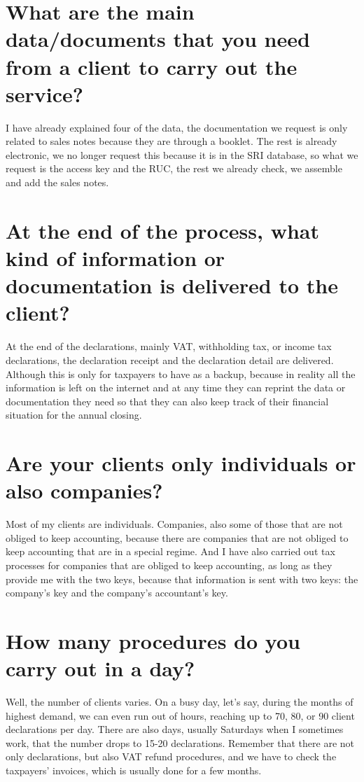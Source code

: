 \documentclass[a4paper]{article}
\begin{document}
\section{What are the main data/documents that you need from a client to carry out the service?}

I have already explained four of the data, the documentation we request is only related to sales notes because they are through a booklet. The rest is already electronic, we no longer request this because it is in the SRI database, so what we request is the access key and the RUC, the rest we already check, we assemble and add the sales notes.

\section{At the end of the process, what kind of information or documentation is delivered to the client?}

At the end of the declarations, mainly VAT, withholding tax, or income tax declarations, the declaration receipt and the declaration detail are delivered. Although this is only for taxpayers to have as a backup, because in reality all the information is left on the internet and at any time they can reprint the data or documentation they need so that they can also keep track of their financial situation for the annual closing.

\section{Are your clients only individuals or also companies?}

Most of my clients are individuals. Companies, also some of those that are not obliged to keep accounting, because there are companies that are not obliged to keep accounting that are in a special regime. And I have also carried out tax processes for companies that are obliged to keep accounting, as long as they provide me with the two keys, because that information is sent with two keys: the company's key and the company's accountant's key.

\section{How many procedures do you carry out in a day?}

Well, the number of clients varies. On a busy day, let's say, during the months of highest demand, we can even run out of hours, reaching up to 70, 80, or 90 client declarations per day. There are also days, usually Saturdays when I sometimes work, that the number drops to 15-20 declarations. Remember that there are not only declarations, but also VAT refund procedures, and we have to check the taxpayers' invoices, which is usually done for a few months.
\end{document}
